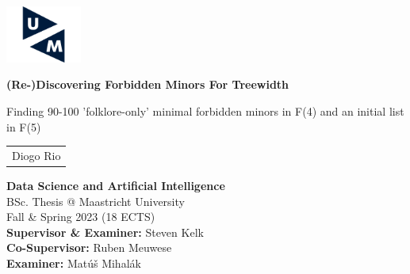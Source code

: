 \begin{titlepage}

\hspace*{-0.5cm}\includegraphics[width=2.5cm]{um-logo.png} \\

\vspace{2cm}

\begin{center}
    
    \vspace{2cm}

    {\huge
    \begin{spacing}{1.0}
        \textbf{(Re-)Discovering Forbidden Minors For Treewidth}
    \end{spacing}
    }
        

    \vspace{0.5cm}                                                                              
    {\LARGE
    \begin{spacing}{1.0}
     Finding 90-100 'folklore-only' minimal forbidden minors in F(4) and an initial list in F(5)
    \end{spacing}
    }

    \vspace{2cm}
        
    {\LARGE \renewcommand{\arraystretch}{1.2}
        \begin{tabular}{c}
            Diogo Rio \\
        \end{tabular}
    }
    
\end{center} 


\vfill
\begin{flushleft}
    { \large
    \textbf{Data Science and Artificial Intelligence} \\  
    BSc. Thesis @ Maastricht University \\  
    Fall \& Spring 2023 (18 ECTS) \\ 
    \textbf{Supervisor \& Examiner:} Steven Kelk \\
    \textbf{Co-Supervisor:} Ruben Meuwese \\
    \textbf{Examiner:} Matúš Mihalák \\
    }
\end{flushleft}

\restoregeometry
\end{titlepage}